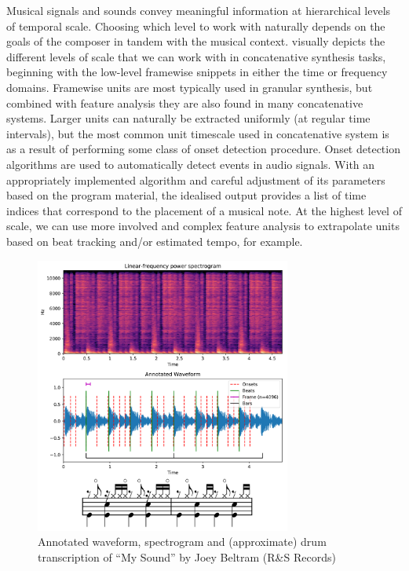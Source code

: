 Musical signals and sounds convey meaningful information at hierarchical levels of temporal scale. Choosing which level to work with naturally depends on the goals of the composer in tandem with the musical context.  visually depicts the different levels of scale that we can work with in concatenative synthesis tasks, beginning with the low-level framewise snippets in either the time or frequency domains. Framewise units are most typically used in granular synthesis, but combined with feature analysis they are also found in many concatenative systems. Larger units can naturally be extracted uniformly (at regular time intervals), but the most common unit timescale used in concatenative system is as a result of performing some class of onset detection procedure. Onset detection algorithms are used to automatically detect events in audio signals. With an appropriately implemented algorithm and careful adjustment of its parameters based on the program material, the idealised output provides a list of time indices that correspond to the placement of a musical note. At the highest level of scale, we can use more involved and complex feature analysis to extrapolate units based on beat tracking and/or estimated tempo, for example.  

\begin{figure}
	\begin{center}
		\includegraphics[width=0.75\textwidth]{ch05_pyconcat/figures/unit_plot.png}
	\end{center}
	\caption[Annotated waveform, spectrogram and drum transcription of ``My Sound'' by Joey Beltram (R\&S Records)]{Annotated waveform, spectrogram and (approximate) drum transcription of ``My Sound'' by Joey Beltram (R\&S Records)}
	\label{fig:beltram}
\end{figure}

